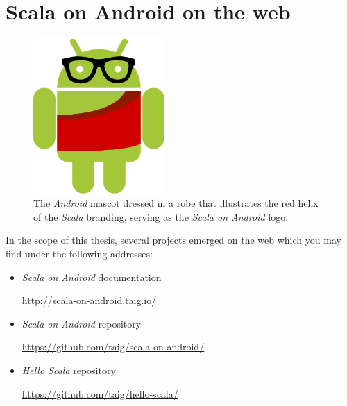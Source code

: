 \section{Scala on Android on the web}

\begin{figure}
	\centering
		\includegraphics[width=5cm]{asset/logo.pdf}
		\caption{The \textit{Android} mascot dressed in a robe that illustrates the red helix of the \textit{Scala} branding, serving as the \textit{Scala on Android} logo.}
\end{figure}

In the scope of this thesis, several projects emerged on the web which you may find under the following addresses:

\begin{itemize}

	\item \textit{Scala on Android} documentation

	\url{http://scala-on-android.taig.io/}

	\item \textit{Scala on Android} repository

	\url{https://github.com/taig/scala-on-android/}

	\item \textit{Hello Scala} repository

	\url{https://github.com/taig/hello-scala/}

\end{itemize}